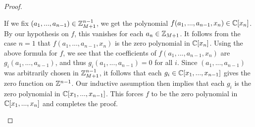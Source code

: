 \begin{proof}
\begin{enumerate}
        If we fix $(a_1,...,a_{n-1})\in \mathbb{Z}^{n-1}_{M+1}$, we get the polynomial $f(a_1,...,a_{n-1}, x_n)\in \mathbb{C}[x_n]$. 
        By our hypothesis on $f$, this vanishes for each $a_n\in \mathbb{Z}_{M+1}$. 
        It follows from the case $n=1$ that $f(a_1,...,a_{n-1},x_n)$ is the zero polynomial in $\mathbb{C}[x_n]$. 
        Using the above formula for $f$, we see that the coefficients of $f(a_1,...,a_{n-1},x_n)$ are $g_i(a_1,...,a_{n-1})$, and thus $g_i(a_1,...,a_{n-1})=0$ for all $i$. 
        Since $(a_1,...,a_{n-1})$ was arbitrarily chosen in $\mathbb{Z}^{n-1}_{M+1}$, it follows that each $g_i\in \mathbb{C}[x_1,...,x_{n-1}]$ gives the zero function on $\mathbb{Z}^{n-1}$. 
        Our inductive assumption then implies that each $g_i$ is the zero polynomial in $\mathbb{C}[x_1,...,x_{n-1}]$. 
        This forces $f$ to be the zero polynomial in $\mathbb{C}[x_1,...,x_n]$ and completes the proof.
    \end{enumerate}
\end{proof}
















